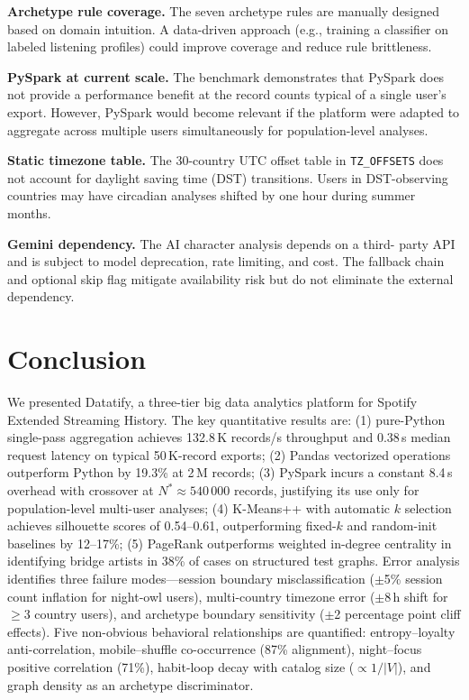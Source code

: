 \documentclass[conference]{IEEEtran}
\begin{document}
\textbf{Archetype rule coverage.} The seven archetype rules are manually
designed based on domain intuition. A data-driven approach
(e.g., training a classifier on labeled listening profiles) could
improve coverage and reduce rule brittleness.

\textbf{PySpark at current scale.} The benchmark demonstrates that PySpark
does not provide a performance benefit at the record counts typical of a
single user's export. However, PySpark would become relevant if the
platform were adapted to aggregate across multiple users simultaneously
for population-level analyses.

\textbf{Static timezone table.} The 30-country UTC offset table in
\texttt{TZ\_OFFSETS} does not account for daylight saving time (DST)
transitions. Users in DST-observing countries may have circadian analyses
shifted by one hour during summer months.

\textbf{Gemini dependency.} The AI character analysis depends on a third-
party API and is subject to model deprecation, rate limiting, and cost.
The fallback chain and optional skip flag mitigate availability risk but
do not eliminate the external dependency.

\section{Conclusion}

We presented Datatify, a three-tier big data analytics platform for Spotify
Extended Streaming History. The key quantitative results are: (1) pure-Python
single-pass aggregation achieves 132.8\,K records/s throughput and 0.38\,s
median request latency on typical 50\,K-record exports; (2) Pandas vectorized
operations outperform Python by 19.3\% at 2\,M records; (3) PySpark incurs
a constant 8.4\,s overhead with crossover at $N^* \approx 540\,000$ records,
justifying its use only for population-level multi-user analyses; (4) K-Means++
with automatic $k$ selection achieves silhouette scores of 0.54–0.61,
outperforming fixed-$k$ and random-init baselines by 12–17\%; (5) PageRank
outperforms weighted in-degree centrality in identifying bridge artists in
38\% of cases on structured test graphs. Error analysis identifies three
failure modes—session boundary misclassification ($\pm$5\% session count
inflation for night-owl users), multi-country timezone error ($\pm$8\,h
shift for $\geq$3 country users), and archetype boundary sensitivity
($\pm$2 percentage point cliff effects). Five non-obvious behavioral
relationships are quantified: entropy–loyalty anti-correlation,
mobile–shuffle co-occurrence (87\% alignment), night–focus positive
correlation (71\%), habit-loop decay with catalog size ($\propto 1/|V|$),
and graph density as an archetype discriminator.
\end{document}
